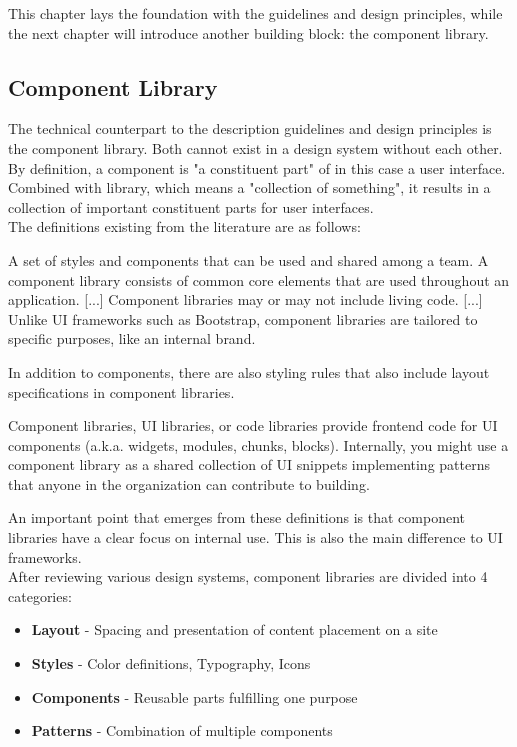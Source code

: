 This chapter lays the foundation with the guidelines and design principles, while the next chapter will introduce another building block: the component library.
\subsection{Component Library}
The technical counterpart to the description guidelines and design principles is the component library. Both cannot exist in a design system without each other.  By definition, a component is "a constituent part"  of in this case a user interface. \cite{component_definition} Combined with library, which means a "collection of something", it results in a collection of important constituent parts for user interfaces. \cite{library_definition} \\

The definitions existing from the literature are as follows:
\begin{tcolorbox}[title=Definition of component library by \citet*{vesselov_building_2019}]
A set of styles and components that can be used and shared among a team. A component library consists of common core elements that are used throughout an application. [...] Component libraries may or may not include living code. [...] Unlike UI frameworks such as Bootstrap, component libraries are tailored to specific purposes, like an internal brand.
\end{tcolorbox}
In addition to components, there are also styling rules that also include layout specifications in component libraries. 
\begin{tcolorbox}[title=Definition of component library by \citet*{macdonald_practical_2019}]
Component libraries, UI libraries, or code libraries provide frontend code for UI components (a.k.a. widgets, modules, chunks, blocks). Internally, you might use a component library as a shared collection of UI snippets implementing patterns that anyone in the organization can contribute to building.
\end{tcolorbox}
An important point that emerges from these definitions is that component libraries have a clear focus on internal use. This is also the main difference to UI frameworks. \\

After reviewing various design systems, component libraries are divided into 4 categories:
\begin{itemize}
	\item \textbf{Layout} - Spacing and presentation of content placement on a site
	\item \textbf{Styles} - Color definitions, Typography, Icons
	\item \textbf{Components} - Reusable parts fulfilling one purpose
	\item \textbf{Patterns} - Combination of multiple components 
\end{itemize}

